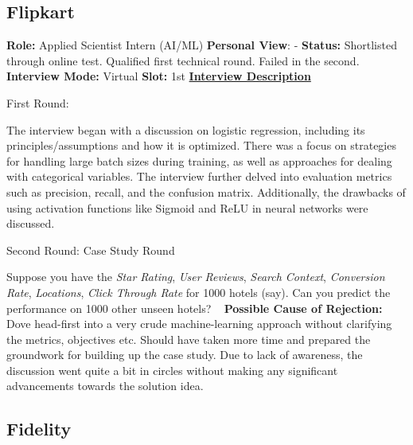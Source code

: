 \documentclass[12pt]{article}
\begin{document}
\subsection{Flipkart}
\textbf{Role:} Applied Scientist Intern (AI/ML)
\newline
\textbf{Personal View}: -
\newline
\textbf{Status:} Shortlisted through online test. Qualified first technical round. Failed in the second.
\newline
\textbf{Interview Mode:} Virtual
\newline
\textbf{Slot:} 1st
\newline
\vspace{10pt}
\newline
\underline{\textbf{Interview Description}}
\newline

First Round:

The interview began with a discussion on logistic regression, including its principles/assumptions and how it is optimized. There was a focus on strategies for handling large batch sizes during training, as well as approaches for dealing with categorical variables. The interview further delved into evaluation metrics such as precision, recall, and the confusion matrix. Additionally, the drawbacks of using activation functions like Sigmoid and ReLU in neural networks were discussed.

Second Round: Case Study Round

Suppose you have the \textit{Star Rating}, \textit{User Reviews}, \textit{Search Context}, \textit{Conversion Rate}, \textit{Locations}, \textit{Click Through Rate} for 1000 hotels (say). Can you predict the performance on 1000 other unseen hotels? 
\newline
\vspace{1pt}\
\newline
\textbf{Possible Cause of Rejection:} Dove head-first into a very crude machine-learning approach without clarifying the metrics, objectives etc. Should have taken more time and prepared the groundwork for building up the case study. Due to lack of awareness, the discussion went quite a bit in circles without making any significant advancements towards the solution idea.





\subsection{Fidelity}
\end{document}
